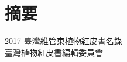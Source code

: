 \thispagestyle{plain}
\chapter*{\hspace{9.5em}摘\hspace{2em}要\hspace{10em}}
\linespread{1.5}\selectfont

\huge 2017 臺灣維管束植物紅皮書名錄 \\
\noindent \Large 臺灣植物紅皮書編輯委員會
\hspace{2em}\\
\\
\normalsize
\\

